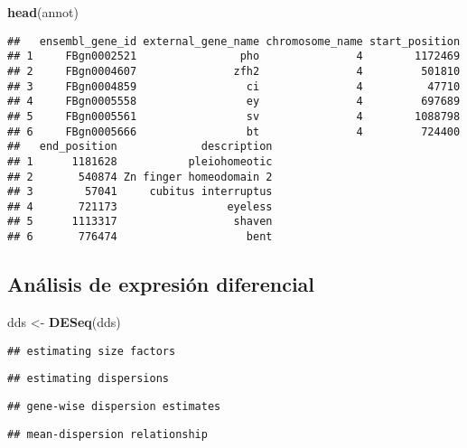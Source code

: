 \documentclass[
]{article}
\newenvironment{Shaded}{\begin{snugshade}}{\end{snugshade}}
\newcommand{\FunctionTok}[1]{\textcolor[rgb]{0.13,0.29,0.53}{\textbf{#1}}}
\newcommand{\NormalTok}[1]{#1}
\newcommand{\OtherTok}[1]{\textcolor[rgb]{0.56,0.35,0.01}{#1}}
\begin{document}
\begin{Shaded}
\begin{Highlighting}[]
\FunctionTok{head}\NormalTok{(annot)}
\end{Highlighting}
\end{Shaded}

\begin{verbatim}
##   ensembl_gene_id external_gene_name chromosome_name start_position
## 1     FBgn0002521                pho               4        1172469
## 2     FBgn0004607               zfh2               4         501810
## 3     FBgn0004859                 ci               4          47710
## 4     FBgn0005558                 ey               4         697689
## 5     FBgn0005561                 sv               4        1088798
## 6     FBgn0005666                 bt               4         724400
##   end_position             description
## 1      1181628           pleiohomeotic
## 2       540874 Zn finger homeodomain 2
## 3        57041     cubitus interruptus
## 4       721173                 eyeless
## 5      1113317                  shaven
## 6       776474                    bent
\end{verbatim}

\subsection{Análisis de expresión
diferencial}\label{anuxe1lisis-de-expresiuxf3n-diferencial}

\begin{Shaded}
\begin{Highlighting}[]
\NormalTok{dds }\OtherTok{\textless{}{-}} \FunctionTok{DESeq}\NormalTok{(dds)}
\end{Highlighting}
\end{Shaded}

\begin{verbatim}
## estimating size factors
\end{verbatim}

\begin{verbatim}
## estimating dispersions
\end{verbatim}

\begin{verbatim}
## gene-wise dispersion estimates
\end{verbatim}

\begin{verbatim}
## mean-dispersion relationship
\end{verbatim}
\end{document}
